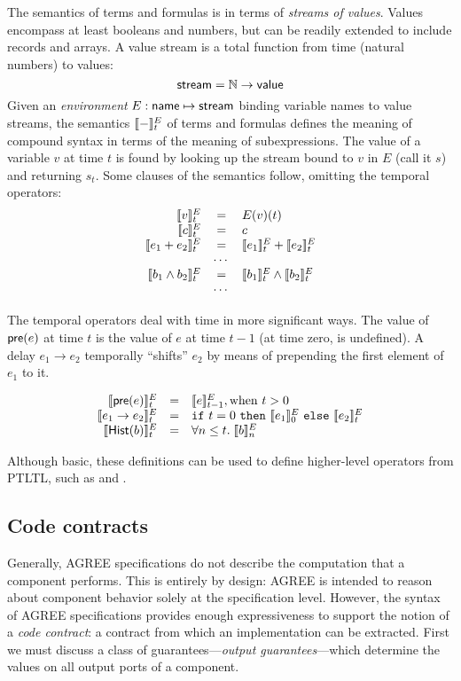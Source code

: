 The semantics of terms and formulas is in terms of \emph{streams of
values}. Values encompass at least booleans and numbers, but can be
readily extended to include records and arrays. A value stream is a
total function from time (natural numbers) to values:
\[
 \mathsf{stream} = \mathbb{N} \to \mathsf{value}
\]
Given an \emph{environment} $E : \mathsf{name} \mapsto \mathsf{stream}$
binding variable names to value streams, the semantics $[\![ - ]\!]^E_t$
of terms and formulas defines the meaning of compound syntax in terms
of the meaning of subexpressions. The value of a variable $v$ at time
$t$ is found by looking up the stream bound to $v$ in $E$ (call it
$s$) and returning $s_t$. Some clauses of the semantics follow,
omitting the temporal operators:
\[
\begin{array}{rcl}
\sem{v}^E_t & = & E(v)(t) \\
\sem{c}^E_t & = & c \\
\sem{e_1 + e_2}^E_t & = & \sem{e_1}^E_t + \sem{e_2}^E_t \\
   & \cdots & \\
\sem{b_1 \land b_2}^E_t & = & \sem{b_1}^E_t \land \sem{b_2}^E_t \\
   & \cdots & \\
\end{array}
\]

The temporal operators deal with time in more significant ways. The
value of $\mathsf{pre}(e)$ at time $t$ is the value of $e$ at time
$t-1$ (at time zero,  is undefined).  A delay $e_1 \to e_2$
temporally ``shifts'' $e_2$ by means of prepending the first element
of $e_1$ to it.

\[
\begin{array}{rcl}
\sem{\konst{pre}(e)}^E_t & = & \sem{e}^E_{t-1}, \mathrm{when}\ t > 0 \\
\sem{e_1 \to e_2}^E_t & = & \itelse{t=0}{\sem{e_1}^E_0}{\sem{e_2}^E_t} \\
\sem{\konst{Hist}(b)}^E_t & = & \forall n \leq t.\; \sem{b}^E_n
\end{array}
\]

Although basic, these definitions can be used to define higher-level
operators from PTLTL, such as  and .

\subsection{Code contracts}
\label{code-contracts}

Generally, AGREE specifications do not describe the computation that a
component performs. This is entirely by design: AGREE is intended to
reason about component behavior solely at the specification
level. However, the syntax of AGREE specifications provides enough
expressiveness to support the notion of a \emph{code contract}: a
contract from which an implementation can be extracted. First we must
discuss a class of guarantees---\emph{output guarantees}---which
determine the values on all output ports of a component.

